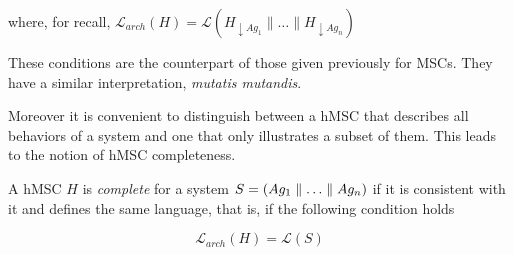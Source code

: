 \noindent where, for recall, $\mathcal{L}_{arch}(H) = \mathcal{L}(H_{\downarrow Ag_1} \parallel \ldots \parallel H_{\downarrow Ag_n})$

These conditions are the counterpart of those given previously for MSCs. They have a similar interpretation, \emph{mutatis mutandis}. 

Moreover it is convenient to distinguish between a hMSC that describes all behaviors of a system and one that only illustrates a subset of them. This leads to the notion of hMSC completeness. 

A hMSC $H$ is \emph{complete} for a system $S = (Ag_1 \parallel \ldots \parallel Ag_n)$ if it is consistent with it and defines the same language, that is, if the following condition holds

\begin{equation}
\mathcal{L}_{arch}(H) = \mathcal{L}(S)
\end{equation}

